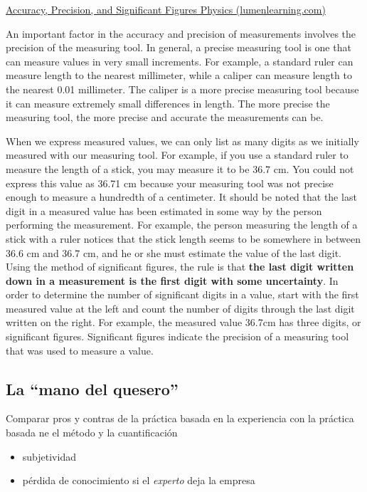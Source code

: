\documentclass[
  letterpaper,
  DIV=11,
  numbers=noendperiod,
  oneside]{scrreprt}
\providecommand{\tightlist}{%
  \setlength{\itemsep}{0pt}\setlength{\parskip}{0pt}}\usepackage{longtable,booktabs,array}
\begin{document}
\href{https://courses.lumenlearning.com/atd-austincc-physics1/chapter/1-3-accuracy-precision-and-significant-figures/}{Accuracy,
Precision, and Significant Figures \textbar{} Physics
(lumenlearning.com)}

An important factor in the accuracy and precision of measurements
involves the precision of the measuring tool. In general, a precise
measuring tool is one that can measure values in very small increments.
For example, a standard ruler can measure length to the nearest
millimeter, while a caliper can measure length to the nearest 0.01
millimeter. The caliper is a more precise measuring tool because it can
measure extremely small differences in length. The more precise the
measuring tool, the more precise and accurate the measurements can be.

When we express measured values, we can only list as many digits as we
initially measured with our measuring tool. For example, if you use a
standard ruler to measure the length of a stick, you may measure it to
be 36.7 cm. You could not express this value as 36.71 cm because your
measuring tool was not precise enough to measure a hundredth of a
centimeter. It should be noted that the last digit in a measured value
has been estimated in some way by the person performing the measurement.
For example, the person measuring the length of a stick with a ruler
notices that the stick length seems to be somewhere in between 36.6 cm
and 36.7 cm, and he or she must estimate the value of the last digit.
Using the method of significant figures, the rule is that \textbf{the
last digit written down in a measurement is the first digit with some
uncertainty}. In order to determine the number of significant digits in
a value, start with the first measured value at the left and count the
number of digits through the last digit written on the right. For
example, the measured value 36.7cm has three digits, or significant
figures. Significant figures indicate the precision of a measuring tool
that was used to measure a value.

\hypertarget{la-mano-del-quesero}{%
\subsection{La ``mano del quesero''}\label{la-mano-del-quesero}}

Comparar pros y contras de la práctica basada en la experiencia con la
práctica basada ne el método y la cuantificación

\begin{itemize}
\tightlist
\item
  subjetividad
\item
  pérdida de conocimiento si el \emph{experto} deja la empresa
\end{itemize}
\end{document}
